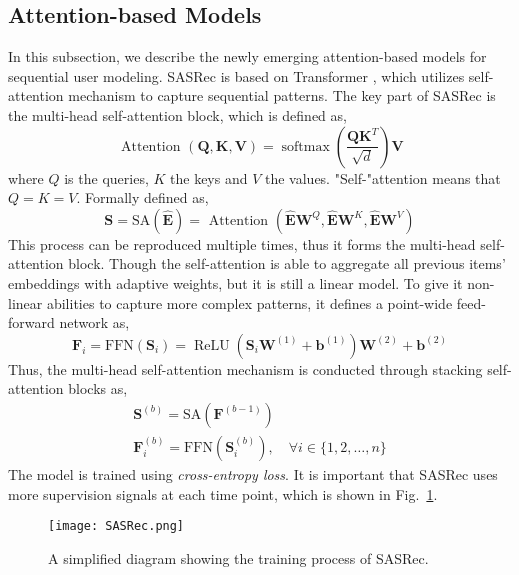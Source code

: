\subsection{Attention-based Models}
In this subsection, we describe the newly emerging attention-based models for 
sequential user modeling. SASRec \cite{kang2018self} is based on Transformer \cite{vaswani2017attention},
which utilizes self-attention mechanism to capture sequential patterns.
The key part of SASRec is the multi-head self-attention block, which is defined as,
\begin{equation}
    \text { Attention }(\mathbf{Q}, \mathbf{K}, \mathbf{V})=\operatorname{softmax}\left(\frac{\mathbf{Q} \mathbf{K}^{T}}{\sqrt{d}}\right) \mathbf{V}
\end{equation}
where $Q$ is the queries, $K$ the keys and $V$ the values. "Self-"attention means
that $Q = K = V$. Formally defined as,
\begin{equation}
    \mathbf{S}=\mathrm{SA}(\widehat{\mathbf{E}})=\text { Attention }\left(\widehat{\mathbf{E}} \mathbf{W}^{Q}, \widehat{\mathbf{E}} \mathbf{W}^{K}, \widehat{\mathbf{E}} \mathbf{W}^{V}\right)
\end{equation}
This process can be reproduced multiple times, thus it forms the multi-head
self-attention block.
Though the self-attention is able to aggregate all previous items’ 
embeddings with adaptive weights, but it is still a linear model. To give it 
non-linear abilities to capture more complex patterns, it defines a point-wide
feed-forward network as, 
\begin{equation}
    \mathbf{F}_{i}=\mathrm{FFN}\left(\mathbf{S}_{i}\right)=\operatorname{ReLU}\left(\mathbf{S}_{i} \mathbf{W}^{(1)}+\mathbf{b}^{(1)}\right) \mathbf{W}^{(2)}+\mathbf{b}^{(2)}
\end{equation}
Thus, the multi-head self-attention mechanism is conducted through stacking
self-attention blocks as, 
\begin{equation}
\begin{array}{c}{\mathbf{S}^{(b)}=\mathrm{SA}\left(\mathbf{F}^{(b-1)}\right)} \\ {\mathbf{F}_{i}^{(b)}=\mathrm{FFN}\left(\mathbf{S}_{i}^{(b)}\right), \quad \forall i \in\{1,2, \ldots, n\}}\end{array}
\end{equation}
The model is trained using \textit{cross-entropy loss}. It is important that
SASRec uses more supervision signals at each time point, which is shown in Fig.~\ref{fig:sasrec}.
\begin{figure}[h]
	\centering
	\texttt{[image: SASRec.png]}
	\caption{A simplified diagram showing the training process of SASRec.}
	\label{fig:sasrec}
	\vspace{-10pt}
\end{figure}
